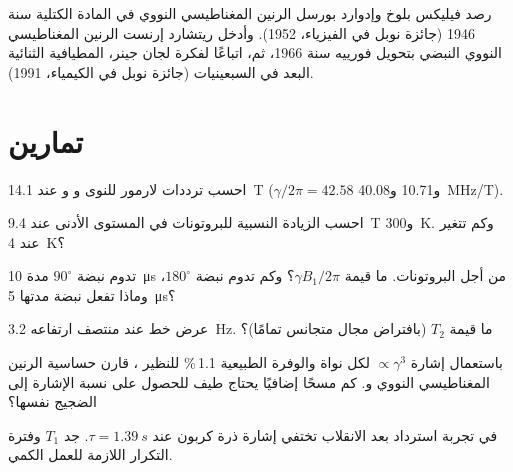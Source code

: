 \begin{history}
رصد فيليكس بلوخ وإدوارد بورسل الرنين المغناطيسي النووي في المادة
الكتلية سنة 1946 (جائزة نوبل في الفيزياء، 1952). وأدخل ريتشارد إرنست الرنين المغناطيسي النووي النبضي
بتحويل فورييه سنة 1966، ثم، اتباعًا لفكرة لجان جينر،
المطيافية الثنائية البعد في السبعينيات (جائزة نوبل في الكيمياء، 1991).
\end{history}

\section{تمارين}

\begin{exercise}[$\star$]\label{exo:b3:advanced-nmr:1}
احسب ترددات لارمور للنوى  و و عند \qty{14.1}{T}
($\gamma/2\pi = 42.58$ و10.71 و\qty{40.08}{MHz/T}).
\end{exercise}

\begin{exercise}[$\star$]\label{exo:b3:advanced-nmr:2}
احسب الزيادة النسبية للبروتونات في المستوى الأدنى عند \qty{9.4}{T} 
و\qty{300}{K}. وكم تتغير عند \qty{4}{K}؟
\end{exercise}

\begin{exercise}[$\star$]\label{exo:b3:advanced-nmr:3}
تدوم نبضة $90^\circ$ مدة \qty{10}{\micro s} من أجل البروتونات. ما قيمة $\gamma B_1/2\pi$؟ وكم تدوم
نبضة $180^\circ$، وماذا تفعل نبضة مدتها \qty{5}{\micro s}؟
\end{exercise}

\begin{exercise}[$\star$]\label{exo:b3:advanced-nmr:4}
عرض خط عند منتصف ارتفاعه \qty{3.2}{Hz}. ما قيمة $T_2$ (بافتراض مجال
متجانس تمامًا)؟
\end{exercise}

\begin{exercise}[$\star\star$]\label{exo:b3:advanced-nmr:5}
باستعمال إشارة $\propto\gamma^3$ لكل نواة والوفرة الطبيعية 1.1\,\% للنظير
، قارن حساسية الرنين المغناطيسي النووي  و. كم مسحًا إضافيًا
يحتاج طيف  للحصول على نسبة الإشارة إلى الضجيج نفسها؟
\end{exercise}

\begin{exercise}[$\star\star$]\label{exo:b3:advanced-nmr:6}
في تجربة استرداد بعد الانقلاب تختفي إشارة ذرة كربون عند
$\tau = \qty{1.39}{s}$. جد $T_1$ وفترة التكرار اللازمة للعمل الكمي.
\end{exercise}

